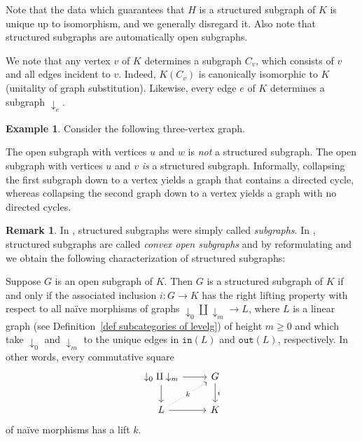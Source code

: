 \documentclass{amsart}
\numberwithin{theorem}{subsection}
\theoremstyle{definition}
\newtheorem{example}[theorem]{Example}
\newtheorem{remark}[theorem]{Remark}
\newcommand{\out}{\mathtt{out}}
\newcommand{\inp}{\mathtt{in}}
\begin{document}
Note that the data which guarantees that $H$ is a structured subgraph of $K$ is unique up to isomorphism, and we generally disregard it.
Also note that structured subgraphs are automatically open subgraphs.

We note that any vertex $v$ of $K$ determines a subgraph $C_v$, which consists of $v$ and all edges incident to $v$.
Indeed, $K(C_v)$ is canonically isomorphic to $K$ (unitality of graph substitution). Likewise, every edge $e$ of $K$ determines a subgraph $\downarrow_e$.

\begin{example}\label{example three vertex}
Consider the following three-vertex graph.
\begin{center}
\end{center}
The open subgraph with vertices $u$ and $w$ is \emph{not} a structured subgraph.
The open subgraph with vertices $u$ and $v$ \emph{is} a structured subgraph. Informally, collapsing the first subgraph down to a vertex yields a graph that contains a directed cycle, whereas collapsing the second graph down to a vertex yields a graph with no directed cycles.
\end{example}

\begin{remark}\label{rem convex}
	In \cite{hrybook}, structured subgraphs were simply called \emph{subgraphs}.
	In \cite{Kock_Properads}, structured subgraphs are called \emph{convex open subgraphs} and by reformulating \cite[1.6.5]{Kock_Properads} and \cite[1.6.10]{Kock_Properads} we obtain the following characterization of structured subgraphs:
	
	Suppose $G$ is an open subgraph of $K$.
	Then $G$ is a structured subgraph of $K$ if and only if the associated inclusion $i\colon G\to K$ has the right lifting property with respect to all na\"ive morphisms of graphs $\downarrow_0 \amalg \downarrow_m \to L$, where $L$ is a linear graph (see Definition~\ref{def subcategories of levelg}) of height $m\geq 0$ and 
	which take $\downarrow_0$ and $\downarrow_m$ to the unique edges in $\inp(L)$ and $\out(L)$, respectively. In other words, every commutative square
\[
\begin{tikzcd}	
\downarrow_0 \amalg \downarrow_m \rar \dar & G \dar{i} \\
L \rar \arrow[ur, dotted, "k" description] & K
\end{tikzcd}
\]
of na\"ive morphisms has a lift $k$.
\end{remark}
\end{document}
